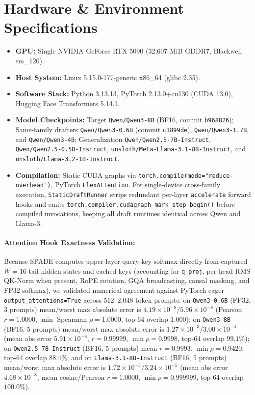 \documentclass[11pt]{article}
\begin{document}
\section{Hardware \& Environment Specifications}
\label{app:hardware}
\begin{itemize}
    \item \textbf{GPU:} Single NVIDIA GeForce RTX 5090 (32,607 MiB GDDR7, Blackwell sm\_120).
    \item \textbf{Host System:} Linux 5.15.0-177-generic x86\_64 (glibc 2.35).
    \item \textbf{Software Stack:} Python 3.13.13, PyTorch 2.13.0+cu130 (CUDA 13.0), Hugging Face Transformers 5.14.1.
    \item \textbf{Model Checkpoints:} Target \texttt{Qwen/Qwen3-8B} (BF16, commit \texttt{b968826}); Same-family drafters \texttt{Qwen/Qwen3-0.6B} (commit \texttt{c1899de}), \texttt{Qwen/Qwen3-1.7B}, and \texttt{Qwen/Qwen3-4B}; Generalization \texttt{Qwen/Qwen2.5-7B-Instruct}, \texttt{Qwen/Qwen2.5-0.5B-Instruct}, \texttt{unsloth/Meta-Llama-3.1-8B-Instruct}, and \texttt{unsloth/Llama-3.2-1B-Instruct}.
    \item \textbf{Compilation:} Static CUDA graphs via \texttt{torch.compile(mode="reduce-overhead")}, PyTorch \texttt{FlexAttention}. For single-device cross-family execution, \texttt{StaticDraftRunner} strips redundant per-layer \texttt{accelerate} forward hooks and emits \texttt{torch.compiler.cudagraph\_mark\_step\_begin()} before compiled invocations, keeping all draft runtimes identical across Qwen and Llama-3.
\end{itemize}

\paragraph{Attention Hook Exactness Validation:}
Because SPADE computes upper-layer query-key softmax directly from captured $W=16$ tail hidden states and cached keys (accounting for \texttt{q\_proj}, per-head RMS QK-Norm when present, RoPE rotation, GQA broadcasting, causal masking, and FP32 softmax), we validated numerical agreement against PyTorch eager \texttt{output\_attentions=True} across 512--2,048 token prompts: on \texttt{Qwen3-0.6B} (FP32, 3 prompts) mean/worst max absolute error is $4.19\times 10^{-8} / 5.96\times 10^{-8}$ (Pearson $r = 1.0000$, $\min$ Spearman $\rho = 1.0000$, top-64 overlap $1.000$); on \texttt{Qwen3-8B} (BF16, 5 prompts) mean/worst max absolute error is $1.27\times 10^{-3} / 3.00\times 10^{-3}$ (mean abs error $5.91\times 10^{-6}$, $r = 0.99999$, $\min \rho = 0.9998$, top-64 overlap $99.1\%$); on \texttt{Qwen2.5-7B-Instruct} (BF16, 5 prompts) mean $r = 0.9993$, $\min \rho = 0.9420$, top-64 overlap $88.4\%$; and on \texttt{Llama-3.1-8B-Instruct} (BF16, 5 prompts) mean/worst max absolute error is $1.72\times 10^{-5} / 3.24\times 10^{-5}$ (mean abs error $4.68\times 10^{-8}$, mean cosine/Pearson $r = 1.0000$, $\min \rho = 0.999999$, top-64 overlap $100.0\%$).
\end{document}
